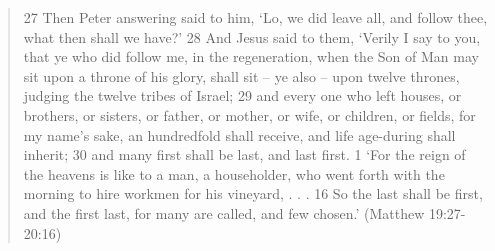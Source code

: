 \documentclass[11pt]{article}
\begin{document}
\begin{quote}
27 Then Peter answering said to him, `Lo, we did leave all, and follow thee, what then shall we have?'
28 And Jesus said to them, `Verily I say to you, that ye who did follow me, in the regeneration, when the Son of Man may sit upon a throne of his glory, shall sit -- ye also -- upon twelve thrones, judging the twelve tribes of Israel;
29 and every one who left houses, or brothers, or sisters, or father, or mother, or wife, or children, or fields, for my name's sake, an hundredfold shall receive, and life age-during shall inherit;
30 and many first shall be last, and last first.
1 `For the reign of the heavens is like to a man, a householder, who went forth with the morning to hire workmen for his vineyard, . . .  16 So the last shall be first, and the first last, for many are called, and few chosen.' (Matthew 19:27-20:16)
\end{quote}
\end{document}
